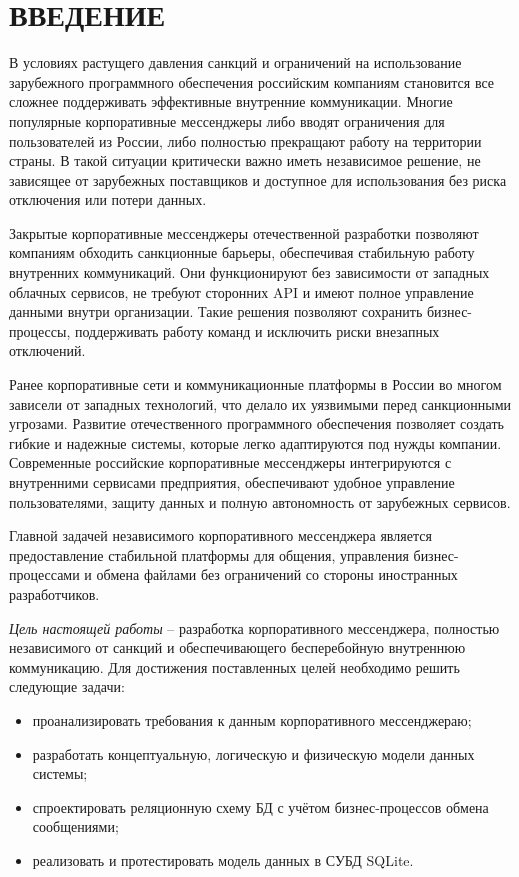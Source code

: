 \section*{ВВЕДЕНИЕ}

В условиях растущего давления санкций и ограничений на использование зарубежного программного обеспечения российским компаниям становится все сложнее поддерживать эффективные внутренние коммуникации. Многие популярные корпоративные мессенджеры либо вводят ограничения для пользователей из России, либо полностью прекращают работу на территории страны. В такой ситуации критически важно иметь независимое решение, не зависящее от зарубежных поставщиков и доступное для использования без риска отключения или потери данных.

Закрытые корпоративные мессенджеры отечественной разработки позволяют компаниям обходить санкционные барьеры, обеспечивая стабильную работу внутренних коммуникаций. Они функционируют без зависимости от западных облачных сервисов, не требуют сторонних API и имеют полное управление данными внутри организации. Такие решения позволяют сохранить бизнес-процессы, поддерживать работу команд и исключить риски внезапных отключений.

Ранее корпоративные сети и коммуникационные платформы в России во многом зависели от западных технологий, что делало их уязвимыми перед санкционными угрозами. Развитие отечественного программного обеспечения позволяет создать гибкие и надежные системы, которые легко адаптируются под нужды компании. Современные российские корпоративные мессенджеры интегрируются с внутренними сервисами предприятия, обеспечивают удобное управление пользователями, защиту данных и полную автономность от зарубежных сервисов.

Главной задачей независимого корпоративного мессенджера является предоставление стабильной платформы для общения, управления бизнес-процессами и обмена файлами без ограничений со стороны иностранных разработчиков.

\textit{Цель настоящей работы} – разработка корпоративного мессенджера, полностью независимого от санкций и обеспечивающего бесперебойную внутреннюю коммуникацию. Для достижения поставленных целей необходимо решить следующие задачи:

\begin{itemize}
	\item проанализировать требования к данным корпоративного мессенджераю;
	\item разработать концептуальную, логическую и физическую модели данных системы;
	\item спроектировать реляционную схему БД с учётом бизнес-процессов обмена сообщениями;
	\item реализовать и протестировать модель данных в СУБД SQLite.
\end{itemize}


